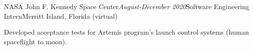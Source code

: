 \begin{rSubsection}{NASA John F. Kennedy Space Center}{\em August-December 2020}{Software Engineering Intern}{Merritt Island, Florida (virtual)}
\item Developed acceptance tests for Artemis program's launch control systems (human spaceflight to moon).
\end{rSubsection}